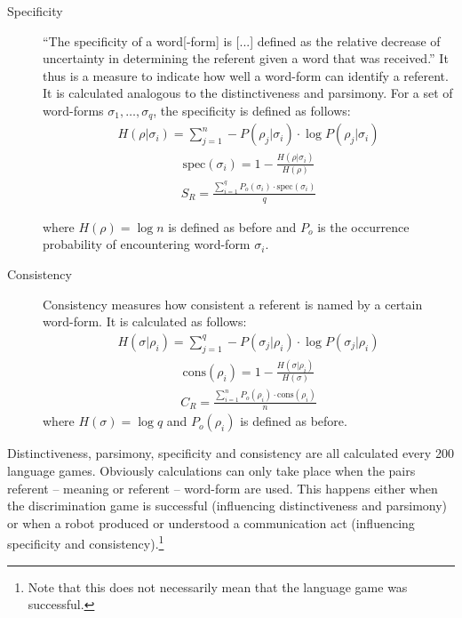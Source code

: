 \begin{description}
\item[Specificity] ``The specificity of a word[-form] is [...] defined as the relative decrease of uncertainty in determining the referent given a word that was received.'' \citep{dejong:2000} It thus is a measure to indicate how well a word-form can identify a referent. It is calculated analogous to the distinctiveness and parsimony. For a set of word-forms $\sigma_1,\ldots,\sigma_q$, the specificity is defined as follows:
\begin{eqnarray}
H(\rho|\sigma_i)=\sum_{j=1}^n -P(\rho_j|\sigma_i) \cdot \log P(\rho_j|\sigma_i)
\end{eqnarray}
\begin{eqnarray}
\mbox{spec}(\sigma_i)=1-\frac{H(\rho|\sigma_i)}{H(\rho)}
\end{eqnarray}
\begin{eqnarray}
S_R=\frac{\sum_{i=1}^q P_o(\sigma_i) \cdot \mbox{spec}(\sigma_i)}{q}
\end{eqnarray}


where $H(\rho)=\log n$ is defined as before and $P_o$ is the occurrence probability of encountering word-form $\sigma_i$.

\item[Consistency] Consistency measures how consistent a referent is named by a certain word-form. It is calculated as follows:
\begin{eqnarray}
H(\sigma|\rho_i)=\sum_{j=1}^q -P(\sigma_j|\rho_i) \cdot \log P(\sigma_j|\rho_i)
\end{eqnarray}
\begin{eqnarray}
\mbox{cons}(\rho_i)=1-\frac{H(\sigma|\rho_i)}{H(\sigma)}
\end{eqnarray}
\begin{eqnarray}
C_R=\frac{\sum_{i=1}^n P_o(\rho_i) \cdot \mbox{cons}(\rho_i)}{n}
\end{eqnarray}
where $H(\sigma)=\log q$ and $P_o(\rho_i)$ is defined as before.
\end{description}

Distinctiveness, parsimony, specificity and consistency are all calculated every 200 language games. Obviously calculations can only take place when the pairs referent -- meaning or referent -- word-form are used. This happens either when the discrimination game is successful (influencing distinctiveness and parsimony) or when a robot produced or understood a communication act (influencing specificity and consistency).\footnote{Note that this does not necessarily mean that the language game was successful.}


